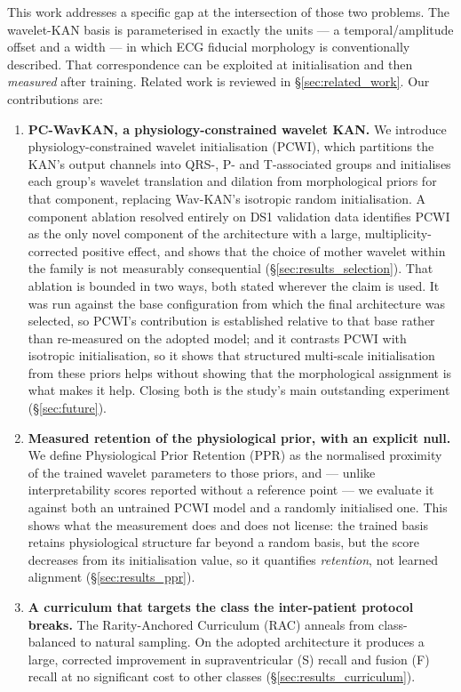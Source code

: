 \documentclass[journal,twoside,web]{ieeecolor}
\begin{document}
This work addresses a specific gap at the intersection of those two problems. The wavelet-KAN basis is parameterised in exactly the units --- a temporal/amplitude offset and a width --- in which ECG fiducial morphology is conventionally described. That correspondence can be exploited at initialisation and then \emph{measured} after training. Related work is reviewed in \S\ref{sec:related_work}. Our contributions are:

\begin{enumerate}
    \item \textbf{PC-WavKAN, a physiology-constrained wavelet KAN.} We introduce physiology-constrained wavelet initialisation (PCWI), which partitions the KAN's output channels into QRS-, P- and T-associated groups and initialises each group's wavelet translation and dilation from morphological priors for that component, replacing Wav-KAN's isotropic random initialisation. A component ablation resolved entirely on DS1 validation data identifies PCWI as the only novel component of the architecture with a large, multiplicity-corrected positive effect, and shows that the choice of mother wavelet within the family is not measurably consequential (\S\ref{sec:results_selection}). That ablation is bounded in two ways, both stated wherever the claim is used. It was run against the base configuration from which the final architecture was selected, so PCWI's contribution is established relative to that base rather than re-measured on the adopted model; and it contrasts PCWI with isotropic initialisation, so it shows that structured multi-scale initialisation from these priors helps without showing that the morphological assignment is what makes it help. Closing both is the study's main outstanding experiment (\S\ref{sec:future}).
    \item \textbf{Measured retention of the physiological prior, with an explicit null.} We define Physiological Prior Retention (PPR) as the normalised proximity of the trained wavelet parameters to those priors, and --- unlike interpretability scores reported without a reference point --- we evaluate it against both an untrained PCWI model and a randomly initialised one. This shows what the measurement does and does not license: the trained basis retains physiological structure far beyond a random basis, but the score decreases from its initialisation value, so it quantifies \emph{retention}, not learned alignment (\S\ref{sec:results_ppr}).
    \item \textbf{A curriculum that targets the class the inter-patient protocol breaks.} The Rarity-Anchored Curriculum (RAC) anneals from class-balanced to natural sampling. On the adopted architecture it produces a large, corrected improvement in supraventricular (S) recall and fusion (F) recall at no significant cost to other classes (\S\ref{sec:results_curriculum}).

\end{enumerate}
\end{document}

